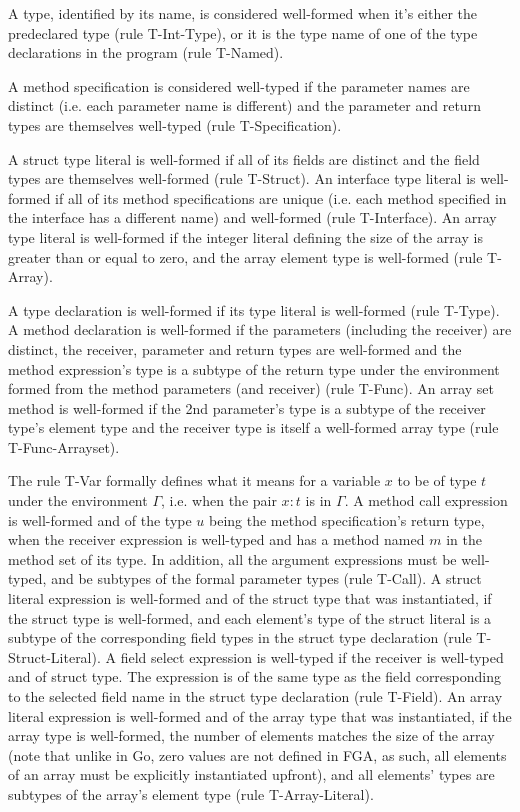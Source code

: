 A type, identified by its name, is considered well-formed when it's either the
predeclared  type (rule T-Int-Type), or it is the type name of one of
the type declarations in the program (rule T-Named).

A method specification is considered well-typed if the parameter names are
distinct (i.e. each parameter name is different) and the parameter and return
types are themselves well-typed (rule T-Specification).

A struct type literal is well-formed if all of its fields are distinct and the
field types are themselves well-formed (rule T-Struct). An interface type
literal is well-formed if all of its method specifications are unique (i.e.
each method specified in the interface has a different name) and well-formed
(rule T-Interface). An array type literal is well-formed if the integer literal
defining the size of the array is greater than or equal to zero, and the array
element type is well-formed (rule T-Array).

A type declaration is well-formed if its type literal is well-formed (rule
T-Type). A method declaration is well-formed if the parameters (including the
receiver) are distinct, the receiver, parameter and return types are well-formed
and the method expression's type is a subtype of the return type under the
environment formed from the method parameters (and receiver) (rule T-Func). An
array set method is well-formed if the 2nd parameter's type is a subtype of the
receiver type's element type and the receiver type is itself a well-formed
array type (rule T-Func-Arrayset).

The rule T-Var formally defines what it means for a variable $x$ to be of type
$t$ under the environment $\Gamma$, i.e. when the pair $x : t$ is in $\Gamma$. A
method call expression is well-formed and of the type $u$ being the method
specification's return type, when the receiver expression is well-typed and has
a method named $m$ in the method set of its type. In addition, all the argument
expressions must be well-typed, and be subtypes of the formal parameter types
(rule T-Call). A struct literal expression is well-formed and of the struct type
that was instantiated, if the struct type is well-formed, and each element's
type of the struct literal is a subtype of the corresponding field types in the
struct type declaration (rule T-Struct-Literal). A field select expression is
well-typed if the receiver is well-typed and of struct type. The expression is
of the same type as the field corresponding to the selected field name in the
struct type declaration (rule T-Field). An array literal expression is
well-formed and of the array type that was instantiated, if the array type is
well-formed, the number of elements matches the size of the array (note that
unlike in Go, zero values are not defined in FGA, as such, all elements of an
array must be explicitly instantiated upfront), and all elements' types are
subtypes of the array's element type (rule T-Array-Literal).

